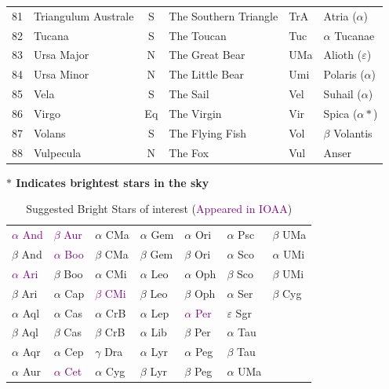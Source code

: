 \documentclass[a4paper,12pt]{extarticle}
\newcommand{\prt}[1]{\textcolor{purple}{#1}}
\begin{document}
\begin{table}[H]
\begin{tabular}{llclll}
81                         & Triangulum Australe                  & S                               & The Southern Triangle                  & TrA                         & Atria ($\alpha$)  \\
82 & Tucana     & S  & The Toucan      & Tuc & $\alpha$ Tucanae       \\
83 & Ursa Major & N  & The Great Bear  & UMa & Alioth ($\varepsilon$) \\
84 & Ursa Minor & N  & The Little Bear & Umi & Polaris ($\alpha$)     \\
85 & Vela       & S  & The Sail        & Vel & Suhail ($\alpha$)      \\
86 & Virgo      & Eq & The Virgin      & Vir & Spica ($\alpha \ast$)  \\
87 & Volans     & S  & The Flying Fish & Vol & $\beta$ Volantis       \\
88 & Vulpecula  & N  & The Fox         & Vul & Anser 
\end{tabular}
\end{table}

\textbf{$\ast$ Indicates brightest stars in the sky}

\begin{table}[H]
\centering
\begin{tabular}{lllllll}
\prt{$\alpha$ And }               & \prt{$\beta$ Aur}  & $\alpha$ CMa  & $\alpha$ Gem & $\alpha$ Ori & $\alpha$ Psc      & $\beta$ UMa   \\
$\beta$ And                 & \prt{$\alpha$ Boo} & $\beta$ CMa   & $\beta$ Gem  & $\beta$ Ori  & $\alpha$ Sco      & $\alpha$ UMi \\
\prt{$\alpha$ Ari}                & $\beta$ Boo  & $\alpha$ CMi  & $\alpha$ Leo & $\alpha$ Oph & $\beta$ Sco       & $\beta$ UMi  \\
$\beta$ Ari                 & $\alpha$ Cap & \prt{$\beta$ CMi}   & $\beta$ Leo  & $\beta$ Oph  & $\alpha$ Ser      & $\beta$ Cyg  \\
$\alpha$ Aql                & $\alpha$ Cas & $\alpha$ CrB  & $\alpha$ Lep & \prt{$\alpha$ Per} & $\varepsilon$ Sgr &              \\
$\beta$ Aql                 & $\beta$ Cas  & $\beta$ CrB   & $\alpha$ Lib & $\beta$ Per  & $\alpha$ Tau      &              \\
$\alpha$ Aqr                & $\alpha$ Cep & $\gamma$  Dra & $\alpha$ Lyr & $\alpha$ Peg & $\beta$ Tau       &              \\
$\alpha$ Aur & \prt{$\alpha$ Cet} & $\alpha$ Cyg  & $\beta$ Lyr  & $\beta$ Peg  & $\alpha$ UMa      &             
\end{tabular}
\caption{Suggested Bright Stars of interest (\prt{Appeared in IOAA})}
\end{table}
\end{document}

